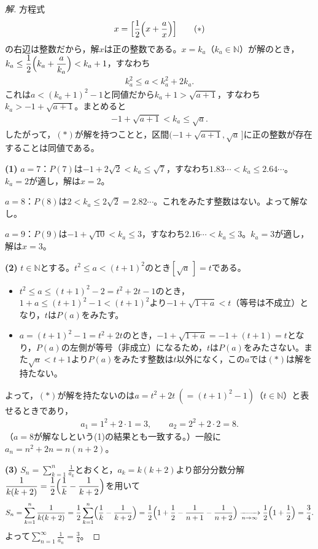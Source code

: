 \documentclass[../main.tex]{subfiles}
\begin{document}
\begin{proof}[解]
  方程式
  \begin{align*}
    x=\Bigl[\frac12\Bigl(x+\frac ax\Bigr)\Bigr]\tag{$\ast$}
  \end{align*}
  の右辺は整数だから，解$x$は正の整数である。$x=k_a$（$k_a\in\mathbb N$）が解のとき，$k_a\le\dfrac12\Bigl(k_a+\dfrac a{k_a}\Bigr)<k_a+1$，すなわち
  \begin{align*}
    k_a^2\le a<k_a^2+2k_a.
  \end{align*}
  これは$a<(k_a+1)^2-1$と同値だから$k_a+1>\sqrt{a+1}$，すなわち$k_a>-1+\sqrt{a+1}$。まとめると
  \begin{align*}
    -1+\sqrt{a+1}<k_a\le\sqrt a.\tag{$P(a)$}
  \end{align*}
  したがって，$(\ast)$が解を持つことと，区間$(-1+\sqrt{a+1},\sqrt a\,]$に正の整数が存在することは同値である。

  \textbf{(1)} $a=7$：$P(7)$は$-1+2\sqrt2<k_a\le\sqrt7$，すなわち$1.83\cdots<k_a\le2.64\cdots$。$k_a=2$が適し，解は$x=2$。

  $a=8$：$P(8)$は$2<k_a\le2\sqrt2=2.82\cdots$。これをみたす整数はない。よって解なし。

  $a=9$：$P(9)$は$-1+\sqrt{10}<k_a\le3$，すなわち$2.16\cdots<k_a\le3$。$k_a=3$が適し，解は$x=3$。

  \textbf{(2)} $t\in\mathbb N$とする。$t^2\le a<(t+1)^2$のとき$[\sqrt a\,]=t$である。
  \begin{itemize}
    \item $t^2\le a\le(t+1)^2-2=t^2+2t-1$のとき，$1+a\le(t+1)^2-1<(t+1)^2$より$-1+\sqrt{1+a}<t$（等号は不成立）となり，$t$は$P(a)$をみたす。
    \item $a=(t+1)^2-1=t^2+2t$のとき，$-1+\sqrt{1+a}=-1+(t+1)=t$となり，$P(a)$の左側が等号（非成立）になるため，$t$は$P(a)$をみたさない。また$\sqrt a<t+1$より$P(a)$をみたす整数は$t$以外になく，この$a$では$(\ast)$は解を持たない。
  \end{itemize}
  よって，$(\ast)$が解を持たないのは$a=t^2+2t\ (=(t+1)^2-1)$（$t\in\mathbb N$）と表せるときであり，
  \begin{align*}
    a_1=1^2+2\cdot1=3,\qquad a_2=2^2+2\cdot2=8.
  \end{align*}
  （$a=8$が解なしという(1)の結果とも一致する。）一般に$a_n=n^2+2n=n(n+2)$。

  \textbf{(3)} $S_n=\displaystyle\sum_{k=1}^n\frac1{a_k}$とおくと，$a_k=k(k+2)$より部分分数分解$\dfrac1{k(k+2)}=\dfrac12\Bigl(\dfrac1k-\dfrac1{k+2}\Bigr)$を用いて
  \begin{align*}
    S_n=\sum_{k=1}^n\frac1{k(k+2)}=\frac12\sum_{k=1}^n\Bigl(\frac1k-\frac1{k+2}\Bigr)=\frac12\Bigl(1+\frac12-\frac1{n+1}-\frac1{n+2}\Bigr)\xrightarrow[n\to\infty]{}\frac12\Bigl(1+\frac12\Bigr)=\frac34.
  \end{align*}
  よって$\displaystyle\sum_{n=1}^\infty\frac1{a_n}=\frac34$。
\end{proof}
\end{document}
